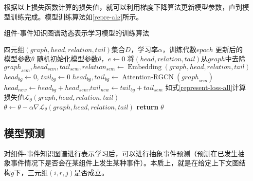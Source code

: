根据以上损失函数计算的损失值，就可以利用梯度下降算法更新模型参数，直到模型训练完成。模型训练算法如\ref{repre-alg}所示。
\begin{algorithm}[htbp]
	\renewcommand{\algorithmicrequire}{\textbf{输入:}}
	\renewcommand{\algorithmicensure}{\textbf{输出:}}
	\caption{组件-事件知识图谱动态表示学习模型的训练算法}
	\label{repre-alg}
	\begin{algorithmic}[1]
		\REQUIRE 四元组$(graph,head,relation,tail)$集合$D$，学习率$\alpha$，训练代数$epoch$
		\ENSURE 更新后的模型参数$\theta$
		\STATE 随机初始化模型参数$\theta$，$e \gets 0$
                    \STATE 将$(head,relation,tail)$从$graph$中去除
                \ENDIF
                \STATE ${graph}_{sem}, {head}_{sem}, {tail}_{sem}, {relation}_{sem} \gets \operatorname{Embedding}(graph,head,relation,tail)$
                \STATE ${head}_{bg} \gets 0$, ${tail}_{bg} \gets 0$ 
                    \STATE ${head}_{bg}, {tail}_{bg} \gets \operatorname{Attention-RGCN}({graph}_{sem})$
                \ENDIF
                \STATE ${head}_{new} \gets {head}_{bg} + {head}_{sem}$,${tail}_{new} \gets {tail}_{bg} + {tail}_{sem} $
                \STATE 如式\ref{represent-loss-all}计算损失值$\mathcal{L}_{\theta }\left(graph,head,relation,tail \right)$
                \STATE $\theta \gets \theta - \alpha \nabla \mathcal{L}_{\theta }\left(graph,head,relation,tail \right)$
            \ENDFOR
        \ENDWHILE 
		\STATE \textbf{return} $\theta$
	\end{algorithmic}  
\end{algorithm}

\subsection{模型预测}
对组件-事件知识图谱进行表示学习后，可以进行抽象事件预测（预测在已发生抽象事件情况下是否会在某组件上发生某种事件）。本质上，就是在给定上下文图结构$g$下，三元组$(i, r, j)$是否成立。

